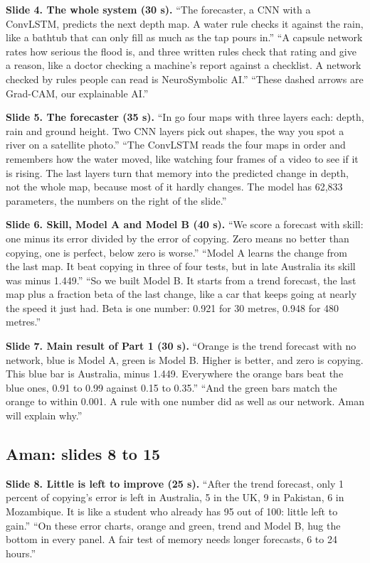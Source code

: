 \textbf{Slide 4. The whole system (30 s).}  ``The forecaster, a CNN with a ConvLSTM, predicts the next depth map. A water rule checks it against the rain, like a bathtub that can only fill as much as the tap pours in.''  ``A capsule network rates how serious the flood is, and three written rules check that rating and give a reason, like a doctor checking a machine's report against a checklist. A network checked by rules people can read is NeuroSymbolic AI.''  ``These dashed arrows are Grad-CAM, our explainable AI.''

\textbf{Slide 5. The forecaster (35 s).}  ``In go four maps with three layers each: depth, rain and ground height. Two CNN layers pick out shapes, the way you spot a river on a satellite photo.''  ``The ConvLSTM reads the four maps in order and remembers how the water moved, like watching four frames of a video to see if it is rising. The last layers turn that memory into the predicted change in depth, not the whole map, because most of it hardly changes. The model has 62,833 parameters, the numbers on the right of the slide.''

\textbf{Slide 6. Skill, Model A and Model B (40 s).}  ``We score a forecast with skill: one minus its error divided by the error of copying. Zero means no better than copying, one is perfect, below zero is worse.''  ``Model A learns the change from the last map. It beat copying in three of four tests, but in late Australia its skill was minus 1.449.''  ``So we built Model B. It starts from a trend forecast, the last map plus a fraction beta of the last change, like a car that keeps going at nearly the speed it just had. Beta is one number: 0.921 for 30 metres, 0.948 for 480 metres.''

\textbf{Slide 7. Main result of Part 1 (30 s).}  ``Orange is the trend forecast with no network, blue is Model A, green is Model B. Higher is better, and zero is copying. This blue bar is Australia, minus 1.449. Everywhere the orange bars beat the blue ones, 0.91 to 0.99 against 0.15 to 0.35.''  ``And the green bars match the orange to within 0.001. A rule with one number did as well as our network. Aman will explain why.''

\subsection{Aman: slides 8 to 15}
\textbf{Slide 8. Little is left to improve (25 s).}  ``After the trend forecast, only 1 percent of copying's error is left in Australia, 5 in the UK, 9 in Pakistan, 6 in Mozambique. It is like a student who already has 95 out of 100: little left to gain.''  ``On these error charts, orange and green, trend and Model B, hug the bottom in every panel. A fair test of memory needs longer forecasts, 6 to 24 hours.''

